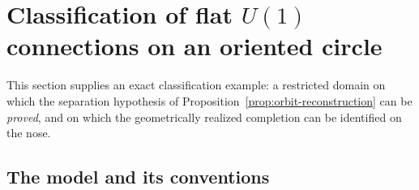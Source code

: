 \documentclass[11pt,a4paper]{article}
\theoremstyle{plain}
\theoremstyle{definition}
\theoremstyle{remark}
\begin{document}
\section{Classification of flat \texorpdfstring{$U(1)$}{U(1)} connections on an oriented circle}
\label{sec:u1}

This section supplies an exact classification example: a restricted domain on which the separation
hypothesis of Proposition~\ref{prop:orbit-reconstruction} can be \emph{proved}, and on which the
geometrically realized completion can be identified on the nose.

\subsection{The model and its conventions}
\end{document}
